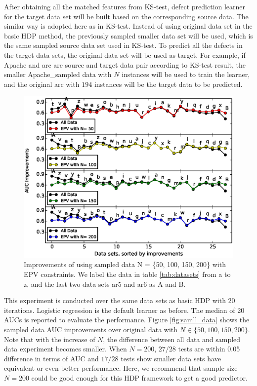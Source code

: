 After obtaining all the matched features from KS-test, defect prediction learner for the target data set will be built based on the corresponding source data. The similar way is adopted here as in KS-test. Instead of using original data set in the basic HDP method, the previously sampled smaller data set will be used, which is the same sampled source data set used in KS-test. To predict all the defects in the target data sets, the original data set will be used as target. For example, if Apache and arc are source and target data pair according to KS-test result, the smaller Apache\_sampled data with $N$ instances will be used to train the learner, and the original arc with $194$ instances will be the target data to be predicted.


\begin{figure}[!htp]
	\centering
	\includegraphics[width=\linewidth]{Figures/raleigh/sample_epv.eps}
	\caption{Improvements of using sampled data N = \{50, 100, 150, 200\} with EPV constraints. We label the data in table \ref{tab:datasets} from a to z, and the last two data sets ar5 and ar6 as A and B.}
	\label{fig:small_epv}
\end{figure}

This experiment is conducted over the same data sets as basic HDP with 20 iterations. Logistic regression is the default learner as before. The median of 20 AUCs is reported to evaluate the performance. 
Figure \ref{fig:samll_data} shows the sampled data AUC improvements over original data with $N \in \{50,100,150,200\}$. Note that with the increase of $N$, the difference between all data and sampled data experiment becomes smaller. When $N=200$, $27/28$ tests are within 0.05 difference in terms of AUC and $17/28$ tests show smaller data sets have equivalent or even better performance. Here, we recommend that sample size $N=200$ could be good enough for this HDP framework to get a good predictor.





